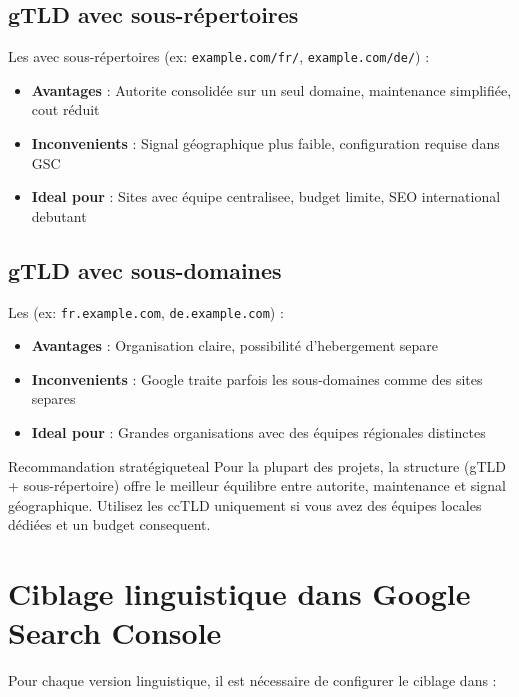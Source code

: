 \subsection{gTLD avec sous-répertoires}

Les  avec sous-répertoires (ex: \texttt{example.com/fr/}, \texttt{example.com/de/}) :

\begin{itemize}
    \item \textbf{Avantages} : Autorite consolidée sur un seul domaine, maintenance simplifiée, cout réduit
    \item \textbf{Inconvenients} : Signal géographique plus faible, configuration requise dans GSC
    \item \textbf{Ideal pour} : Sites avec équipe centralisee, budget limite, SEO international debutant
\end{itemize}

\subsection{gTLD avec sous-domaines}

Les  (ex: \texttt{fr.example.com}, \texttt{de.example.com}) :

\begin{itemize}
    \item \textbf{Avantages} : Organisation claire, possibilité d'hebergement separe
    \item \textbf{Inconvenients} : Google traite parfois les sous-domaines comme des sites separes
    \item \textbf{Ideal pour} : Grandes organisations avec des équipes régionales distinctes
\end{itemize}

\begin{mybox}{Recommandation stratégique}{teal}
Pour la plupart des projets, la structure  (gTLD + sous-répertoire) offre le meilleur équilibre entre autorite, maintenance et signal géographique. Utilisez les ccTLD uniquement si vous avez des équipes locales dédiées et un budget consequent.
\end{mybox}

\section{Ciblage linguistique dans Google Search Console}

Pour chaque version linguistique, il est nécessaire de configurer le ciblage dans  :

